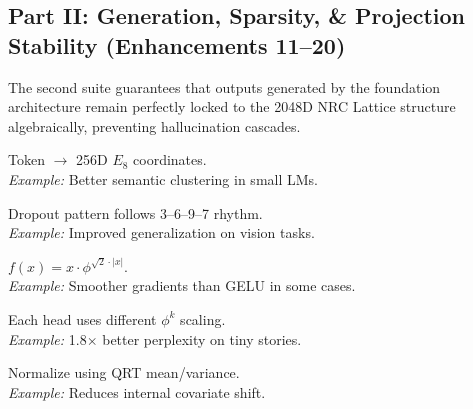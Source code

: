 \subsection{Part II\@: Generation, Sparsity, \& Projection Stability (Enhancements 11--20)}

The second suite guarantees that outputs generated by the foundation architecture remain perfectly locked to the 2048D NRC Lattice structure algebraically, preventing hallucination cascades.

\begin{tcolorbox}[
	enhanced,
	colback=nrccream!85!white,
	colframe=nrcblue,
	boxrule=0.5mm,
	title=\textbf{11. 256D lattice token embeddings}
	]
	Token $\to$ 256D $E_8$ coordinates. \\
	\textit{Example:} Better semantic clustering in small LMs.
\end{tcolorbox}

\begin{tcolorbox}[
	enhanced,
	colback=nrccream!85!white,
	colframe=nrcblue,
	boxrule=0.5mm,
	title=\textbf{12. 3--6--9--7 cycle dropout mask}
	]
	Dropout pattern follows 3--6--9--7 rhythm. \\
	\textit{Example:} Improved generalization on vision tasks.
\end{tcolorbox}

\begin{tcolorbox}[
	enhanced,
	colback=nrccream!85!white,
	colframe=nrcblue,
	boxrule=0.5mm,
	title=\textbf{13. $\phi^{\sqrt{2}}$ activation function}
	]
	$f(x) = x \cdot \phi^{\sqrt{2} \cdot |x|}$. \\
	\textit{Example:} Smoother gradients than GELU in some cases.
\end{tcolorbox}

\begin{tcolorbox}[
	enhanced,
	colback=nrccream!85!white,
	colframe=nrcblue,
	boxrule=0.5mm,
	title=\textbf{14. TTT multi-head $\phi$-tensor contraction}
	]
	Each head uses different $\phi^k$ scaling. \\
	\textit{Example:} 1.8$\times$ better perplexity on tiny stories.
\end{tcolorbox}

\begin{tcolorbox}[
	enhanced,
	colback=nrccream!85!white,
	colframe=nrcblue,
	boxrule=0.5mm,
	title=\textbf{15. QRT layer-norm stabilization}
	]
	Normalize using QRT mean/variance. \\
	\textit{Example:} Reduces internal covariate shift.
\end{tcolorbox}

